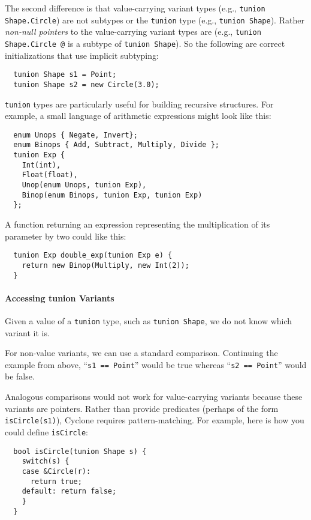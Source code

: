 The second difference is that value-carrying variant types (e.g.,
\texttt{tunion Shape.Circle}) are not subtypes or the \texttt{tunion} type
(e.g., \texttt{tunion Shape}).  Rather \textit{non-null pointers} to the
value-carrying variant types are (e.g., \texttt{tunion Shape.Circle @}
is a subtype of \texttt{tunion Shape}).  So the following are correct
initializations that use implicit subtyping:

\begin{verbatim}
  tunion Shape s1 = Point;
  tunion Shape s2 = new Circle(3.0);
\end{verbatim}

\texttt{tunion} types are particularly useful for building recursive
structures.  For example, a small language of arithmetic expressions
might look like this:
\begin{verbatim}
  enum Unops { Negate, Invert};
  enum Binops { Add, Subtract, Multiply, Divide };
  tunion Exp {
    Int(int),
    Float(float),
    Unop(enum Unops, tunion Exp),
    Binop(enum Binops, tunion Exp, tunion Exp)
  };
\end{verbatim}

A function returning an expression representing the multiplication of
its parameter by two could like this:
\begin{verbatim}
  tunion Exp double_exp(tunion Exp e) {
    return new Binop(Multiply, new Int(2));
  }
\end{verbatim}

\paragraph{Accessing tunion Variants} Given a value of a \texttt{tunion}
type, such as \texttt{tunion Shape}, we do not know which variant it is.

For non-value variants, we can use a standard comparison.  Continuing
the example from above, ``\texttt{s1 == Point}'' would be true whereas
``\texttt{s2 == Point}'' would be false.

Analogous comparisons would not work for value-carrying variants
because these variants are pointers.  Rather than provide predicates
(perhaps of the form \texttt{isCircle(s1)}), Cyclone requires
pattern-matching.  For example, here is how you could define
\texttt{isCircle}:
\begin{verbatim}
  bool isCircle(tunion Shape s) {
    switch(s) {
    case &Circle(r):
      return true;
    default: return false;
    }
  }
\end{verbatim}

